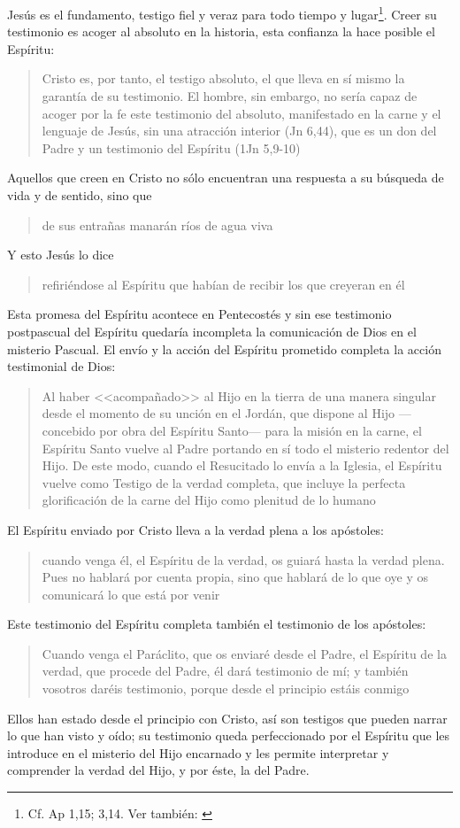 Jesús es el fundamento, testigo fiel y veraz para todo tiempo y lugar\footnote{Cf. Ap 1,15; 3,14. Ver también: \cite[132]{prades2015testimonio}}. Creer su testimonio es acoger al absoluto en la historia, esta confianza la hace posible el Espíritu: \blockquote[{\cite{latourelle2000testimonio}}]{Cristo es, por tanto, el testigo absoluto, el que lleva en sí mismo la garantía de su testimonio. El hombre, sin embargo, no sería capaz de acoger por la fe este testimonio del absoluto, manifestado en la carne y el lenguaje de Jesús, sin una atracción interior (Jn 6,44), que es un don del Padre y un testimonio del Espíritu (1Jn 5,9-10)}.

Aquellos que creen en Cristo no sólo encuentran una respuesta a su búsqueda de vida y de sentido, sino que \blockquote[][\,(Jn 7,38)]{de sus entrañas manarán ríos de agua viva}. Y esto Jesús lo dice \blockquote[][\,(Jn 7,39)]{refiriéndose al Espíritu que habían de recibir los que creyeran en él}. Esta promesa del Espíritu acontece en Pentecostés y sin ese testimonio postpascual del Espíritu quedaría incompleta la comunicación de Dios en el misterio Pascual\autocite[Cf.~][135]{prades2015testimonio}. El envío y la acción del Espíritu prometido completa la acción testimonial de Dios: \blockquote[{\cite[134-135]{prades2015testimonio}}]{Al haber <<acompañado>> al Hijo en la tierra de una manera singular desde el momento de su unción en el Jordán, que dispone al Hijo ---concebido por obra del Espíritu Santo--- para la misión en la carne, el Espíritu Santo vuelve al Padre portando en sí todo el misterio redentor del Hijo. De este modo, cuando el Resucitado lo envía a la Iglesia, el Espíritu vuelve como Testigo de la verdad completa, que incluye la perfecta glorificación de la carne del Hijo como plenitud de lo humano}.

El Espíritu enviado por Cristo lleva a la verdad plena a los apóstoles: \blockquote[][\,(Jn 16,13)]{cuando venga él, el Espíritu de la verdad, os guiará hasta la verdad plena. Pues no hablará por cuenta propia, sino que hablará de lo que oye y os comunicará lo que está por venir}. Este testimonio del Espíritu completa también el testimonio de los apóstoles: \blockquote[][\,(Jn 15,26-27)]{Cuando venga el Paráclito, que os enviaré desde el Padre, el Espíritu de la verdad, que procede del Padre, él dará testimonio de mí; y también vosotros daréis testimonio, porque desde el principio estáis conmigo}. Ellos han estado desde el principio con Cristo, así son testigos que pueden narrar lo que han visto y oído; su testimonio queda perfeccionado por el Espíritu que les introduce en el misterio del Hijo encarnado y les permite interpretar y comprender la verdad del Hijo, y por éste, la del Padre\autocite[Cf.~][139]{prades2015testimonio}.

